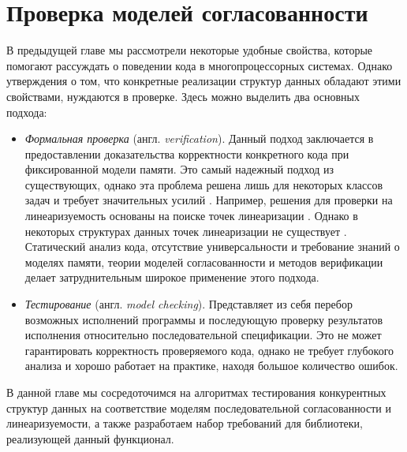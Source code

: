 \documentclass[14pt, openany]{book}
\begin{document}
\chapter{Проверка моделей согласованности}
В предыдущей главе мы рассмотрели некоторые удобные свойства, которые помогают рассуждать о поведении кода в многопроцессорных системах. Однако утверждения о том, что конкретные реализации структур данных обладают этими свойствами, нуждаются в проверке. Здесь можно выделить два основных подхода: 
\begin{itemize}
    \item \emph{Формальная проверка} (англ. \emph{verification}). Данный подход заключается в предоставлении доказательства корректности конкретного кода при фиксированной модели памяти. Это самый надежный подход из существующих, однако эта проблема решена лишь для некоторых классов задач и требует значительных усилий \cite{seqVerification}. Например, решения для проверки на линеаризуемость основаны на поиске точек линеаризации \cite{linVerification}. Однако в некоторых структурах данных точек линеаризации не существует \cite{linearizable}. Статический анализ кода, отсутствие универсальности и требование знаний о моделях памяти, теории моделей согласованности и методов верификации делает затруднительным широкое применение этого подхода.
    \item \emph{Тестирование} (англ. \emph{model checking}). Представляет из себя перебор возможных исполнений программы и последующую проверку результатов исполнения относительно последовательной спецификации. Это не может гарантировать корректность проверяемого кода, однако не требует глубокого анализа и хорошо работает на практике, находя большое количество ошибок. \cite{lineup} 
\end{itemize}

В данной главе мы сосредоточимся на алгоритмах тестирования конкурентных структур данных на соответствие моделям последовательной согласованности и линеаризуемости, а также разработаем набор требований для библиотеки, реализующей данный функционал.
\end{document}
